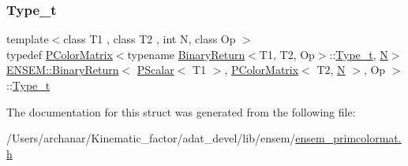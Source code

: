 \subsubsection{\texorpdfstring{Type\_t}{Type\_t}\hspace{0.1cm}{\footnotesize\ttfamily [2/2]}}
{\footnotesize\ttfamily template$<$class T1 , class T2 , int N, class Op $>$ \\
typedef \mbox{\hyperlink{classENSEM_1_1PColorMatrix}{P\+Color\+Matrix}}$<$typename \mbox{\hyperlink{structENSEM_1_1BinaryReturn}{Binary\+Return}}$<$T1, T2, Op$>$\+::\mbox{\hyperlink{structENSEM_1_1BinaryReturn_3_01PScalar_3_01T1_01_4_00_01PColorMatrix_3_01T2_00_01N_01_4_00_01Op_01_4_a97b44a952bd9e0913c09d9be8de65a5e}{Type\+\_\+t}}, \mbox{\hyperlink{operator__name__util_8cc_a7722c8ecbb62d99aee7ce68b1752f337}{N}}$>$ \mbox{\hyperlink{structENSEM_1_1BinaryReturn}{E\+N\+S\+E\+M\+::\+Binary\+Return}}$<$ \mbox{\hyperlink{classENSEM_1_1PScalar}{P\+Scalar}}$<$ T1 $>$, \mbox{\hyperlink{classENSEM_1_1PColorMatrix}{P\+Color\+Matrix}}$<$ T2, \mbox{\hyperlink{operator__name__util_8cc_a7722c8ecbb62d99aee7ce68b1752f337}{N}} $>$, Op $>$\+::\mbox{\hyperlink{structENSEM_1_1BinaryReturn_3_01PScalar_3_01T1_01_4_00_01PColorMatrix_3_01T2_00_01N_01_4_00_01Op_01_4_a97b44a952bd9e0913c09d9be8de65a5e}{Type\+\_\+t}}}



The documentation for this struct was generated from the following file\+:\begin{DoxyCompactItemize}
\item 
/\+Users/archanar/\+Kinematic\+\_\+factor/adat\+\_\+devel/lib/ensem/\mbox{\hyperlink{lib_2ensem_2ensem__primcolormat_8h}{ensem\+\_\+primcolormat.\+h}}\end{DoxyCompactItemize}
